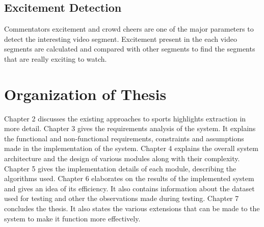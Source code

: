 \subsection{Excitement Detection}
Commentators excitement and crowd cheers are one of the major parameters to detect the interesting video segment. Excitement present in the each video segments are calculated and compared with other segments to find the segments that are really exciting to watch.

\section{Organization of Thesis}
Chapter 2 discusses the existing approaches to sports highlights extraction in more detail. Chapter 3 gives the requirements analysis of the system. It explains the functional and non-functional requirements, constraints and assumptions made in the implementation of the system. Chapter 4 explains the overall system architecture and the design of various modules along with their complexity. Chapter 5 gives the implementation details of each module, describing the algorithms used. Chapter 6 elaborates on the results of the implemented system and gives an idea of its efficiency. It also contains information about the dataset used for testing and other the observations made during testing. Chapter 7 concludes the thesis. It also states the various extensions that can be made to the system to make it function more effectively.